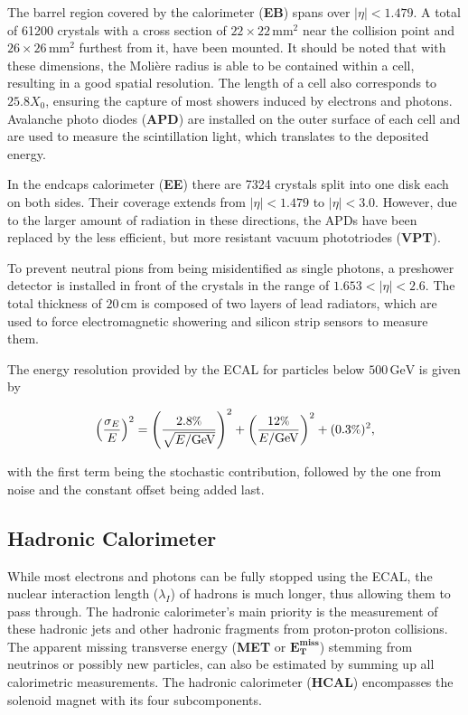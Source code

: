 The barrel region covered by the calorimeter (\textbf{EB}) spans over $|\eta| < 1.479$. A total of 61200 crystals with a cross section of $22 \times 22\,\text{mm}^2$ near the collision point and $26 \times 26\,\text{mm}^2$ furthest from it, have been mounted. It should be noted that with these dimensions, the Moli\`{e}re radius is able to be contained within a cell, resulting in a good spatial resolution. The length of a cell also corresponds to $25.8 X_0$, ensuring the capture of most showers induced by electrons and photons. Avalanche photo diodes (\textbf{APD}) are installed on the outer surface of each cell and are used to measure the scintillation light, which translates to the deposited energy.

In the endcaps calorimeter (\textbf{EE}) there are 7324 crystals split into one disk each on both sides. Their coverage extends from $|\eta| < 1.479$ to $|\eta| < 3.0$. However, due to the larger amount of radiation in these directions, the APDs have been replaced by the less efficient, but more resistant vacuum phototriodes (\textbf{VPT}).

To prevent neutral pions from being misidentified as single photons, a preshower detector is installed in front of the crystals in the range of $1.653 < |\eta| < 2.6$. The total thickness of $20\,\text{cm}$ is composed of two layers of lead radiators, which are used to force electromagnetic showering and silicon strip sensors to measure them.

The energy resolution provided by the ECAL for particles below $500\,\text{GeV}$ is given by

\begin{equation}
  \label{eq:ecalreso}
  \left( \frac{ \sigma_E}{E} \right)^2 = \left( \frac{2.8\pct}{\sqrt{E/\text{GeV}}} \right)^2 + \left( \frac{12\pct}{E/\text{GeV}} \right)^2 + (0.3\pct)^2,
\end{equation}

\noindent with the first term being the stochastic contribution, followed by the one from noise and the constant offset being added last.


\subsection{Hadronic Calorimeter}

While most electrons and photons can be fully stopped using the ECAL, the nuclear interaction length ($\lambda_I$) of hadrons is much longer, thus allowing them to pass through. The hadronic calorimeter's main priority is the measurement of these hadronic jets and other hadronic fragments from proton-proton collisions. The apparent missing transverse energy (\textbf{MET} or $\mathbf{E^{\text{miss}}_{\text{T}}}$) stemming from neutrinos or possibly new particles, can also be estimated by summing up all calorimetric measurements. The hadronic calorimeter (\textbf{HCAL}) encompasses the solenoid magnet with its four subcomponents. 

